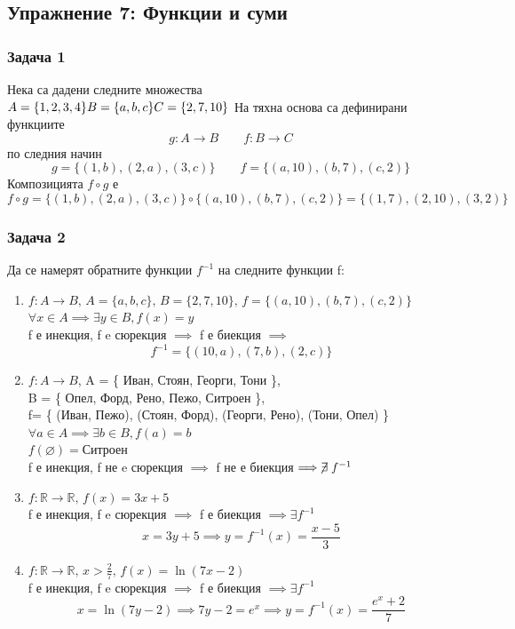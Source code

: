 \documentclass[fleqn, 12pt]{article}
\theoremstyle{definition}
\begin{document}
\newpage
\subsection{Упражнение 7: Функции и суми}

\subsubsection*{Задача 1}
Нека са дадени следните множества \\
$
A = \{1, 2, 3, 4\} \\
B = \{ a, b, c\} \\
C = \{2, 7, 10 \}
$
На тяхна основа са дефинирани функциите \\
$$g: A \to B \qquad f: B \to C$$
по следния начин
$$g = \{ (1, b), (2, a), (3, c) \} \qquad f = \{ (a, 10), (b, 7), (c, 2) \}$$
Композицията $f \circ g$ е \\
$$ f \circ g = \{ (1, b), (2, a), (3, c) \} \circ  \{ (a, 10), (b, 7), (c, 2) \} = \{ (1, 7), (2, 10), (3, 2) \}$$

\subsubsection*{Задача 2}
Да се намерят обратните функции $f^{-1}$ на следните функции f:
\begin{enumerate}
\item $f: A \to B, \, A = \{ a, b, c \}, \, B = \{2, 7, 10 \}, \, f = \{ (a, 10), (b, 7), (c, 2) \}$
$\forall x \in A \implies \exists y \in B, f(x) = y$\\
f е инекция, f e сюрекция $\implies$ f е биекция $\implies$
$$f^{-1} = \{ (10, a), (7, b), (2, c) \}$$
\item $f: A \to B$, A = \{ Иван, Стоян, Георги, Тони \}, \\
B = \{ Опел, Форд, Рено, Пежо, Ситроен \},\\ 
f= \{ (Иван, Пежо), (Стоян, Форд), (Георги, Рено), (Тони, Опел) \} \\
$\forall a \in A \implies \exists b \in B, f(a) = b$ \\
$f(\varnothing) = \text{Ситроен}$\\
f е инекция, f не e сюрекция $\implies $ f не е биекция$\implies \centernot\exists f^{-1}$ 
\item $f: \mathbb{R} \to \mathbb{R}, \, f(x) = 3x + 5$ \\
f е инекция, f e сюрекция $\implies$ f е биекция $\implies \exists f^{-1}$
$$x = 3y + 5 \implies y = f^{-1}(x) = \frac{x-5}{3} $$
\item $f: \mathbb{R} \to \mathbb{R}, \, x > \frac{2}{7}, \, f(x) = \ln{(7x-2)}$\\
f е инекция, f e сюрекция $\implies$ f е биекция $\implies \exists f^{-1}$
$$x = \ln{(7y-2)} \implies 7y - 2 = e^x \implies y = f^{-1}(x) = \frac{e^x + 2}{7}$$
\end{enumerate}
\end{document}
